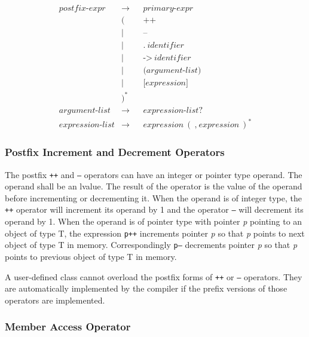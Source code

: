 \documentclass[a4paper,oneside,11pt]{article}
\begin{document}
\begin{align*}
postfix\textrm{-}expr &\rightarrow & &\hyperref[primary]{primary\textrm{-}expr}\\
&( & &\hyperref[postfixincdec]{\texttt{++}}\\
&| & &\hyperref[postfixincdec]{\texttt{--}}\\
&| & &\hyperref[member]{\texttt{.}} \> \hyperref[identifier]{identifier}\\
&| & &\hyperref[ptrmember]{\texttt{->}} \> \hyperref[identifier]{identifier}\\
&| & &\hyperref[invocation]{\texttt{(} argument\textrm{-}list \texttt{)}}\\
&| & &\hyperref[indexing]{\texttt{[} expression \texttt{]}}\\
&)^*\\
argument\textrm{-}list &\rightarrow & &expression\textrm{-}list?\\
expression\textrm{-}list &\rightarrow & &\hyperref[expression]{expression} \> (\> \texttt{,} \> \hyperref[expression]{expression} \>)^*
\end{align*}

\subsubsection{Postfix Increment and Decrement Operators}\label{postfixincdec}

The postfix \texttt{++} and \texttt{--} operators can have an integer or pointer type operand. The operand shall be an lvalue.
The result of the operator is the value of the operand before incrementing or decrementing it.
When the operand is of integer type, the \texttt{++} operator will increment its operand by 1 and the operator \texttt{--} will decrement its operand by 1.
When the operand is of pointer type with pointer \emph{p} pointing to an object of type T,
the expression \texttt{p++} increments pointer \emph{p} so that \emph{p} points to next object of type T in memory.
Correspondingly \texttt{p--} decrements pointer \emph{p} so that \emph{p} points to previous object of type T in memory.

A user-defined class cannot overload the postfix forms of \texttt{++} or \texttt{--} operators.
They are automatically implemented by the compiler if the prefix versions of those operators are implemented.

\subsubsection{Member Access Operator}\label{member}
\end{document}
